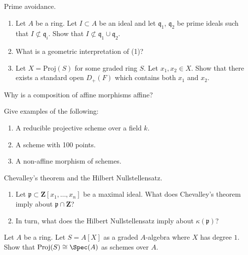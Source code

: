 \begin{exercise}
\label{exercise-prime-avoidance}
Prime avoidance.
\begin{enumerate}
\item Let $A$ be a ring. Let $I \subset A$ be an ideal and
let $\mathfrak q_1$, $\mathfrak q_2$ be prime ideals such that
$I \not \subset \mathfrak q_i$. Show that
$I \not \subset \mathfrak q_1 \cup \mathfrak q_2$.
\item What is a geometric interpretation of (1)?
\item Let $X = \text{Proj}(S)$ for some graded ring $S$.
Let $x_1, x_2 \in X$. Show that there exists a standard open
$D_{+}(F)$ which contains both $x_1$ and $x_2$.
\end{enumerate}
\end{exercise}

\begin{exercise}
\label{exercise-compose-affine}
Why is a composition of affine morphisms affine?
\end{exercise}

\begin{exercise}[Examples]
\label{exercise-examples}
Give examples of the following:
\begin{enumerate}
\item A reducible projective scheme over a field $k$.
\item A scheme with 100 points.
\item A non-affine morphism of schemes.
\end{enumerate}
\end{exercise}

\begin{exercise}
\label{exercise-chevalley-hilbert-nullstellensatz}
Chevalley's theorem and the Hilbert Nullstellensatz.
\begin{enumerate}
\item Let $\mathfrak p \subset \mathbf{Z}[x_1, \ldots, x_n]$
be a maximal ideal. What does Chevalley's theorem imply about
$\mathfrak p \cap \mathbf{Z}$?
\item In turn, what does the Hilbert Nullstellensatz imply about
$\kappa(\mathfrak p)$?
\end{enumerate}
\end{exercise}

\begin{exercise}
\label{exercise-P0}
Let $A$ be a ring. Let $S = A[X]$ as a graded $A$-algebra
where $X$ has degree $1$. Show that $\text{Proj}(S) \cong \Spec(A)$
as schemes over $A$.
\end{exercise}

